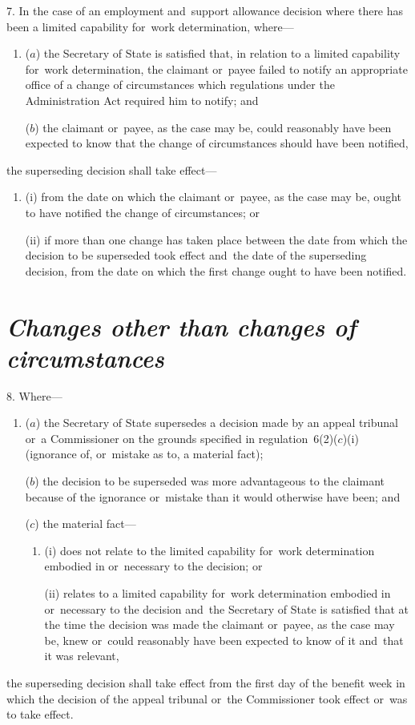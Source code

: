\documentclass[12pt,a4paper]{article}
\begin{document}
7.  In the case of an employment and~support allowance decision where there has been a limited capability for~work determination, where—
\begin{enumerate}\item[]
($a$) the Secretary of State is satisfied that, in relation to a limited capability for~work determination, the claimant or~payee failed to notify an appropriate office of a change of circumstances which regulations under the Administration Act required him to notify; and

($b$) the claimant or~payee, as the case may be, could reasonably have been expected to know that the change of circumstances should have been notified,
\end{enumerate}
the superseding decision shall take effect—
\begin{enumerate}\item[]
(i) from the date on which the claimant or~payee, as the case may be, ought to have notified the change of circumstances; or

(ii) if more than one change has taken place between the date from which the decision to be superseded took effect and~the date of the superseding decision, from the date on which the first change ought to have been notified.
\end{enumerate}

\section*{\itshape Changes other than changes of circumstances}

8.  Where—
\begin{enumerate}\item[]
($a$) the Secretary of State supersedes a decision made by an appeal tribunal or~a Commissioner on the grounds specified in regulation~6(2)($c$)(i)  (ignorance of, or~mistake as to, a material fact);

($b$) the decision to be superseded was more advantageous to the claimant because of the ignorance or~mistake than it would otherwise have been; and

($c$) the material fact—
\begin{enumerate}\item[]
(i) does not relate to the limited capability for~work determination embodied in or~necessary to the decision; or

(ii) relates to a limited capability for~work determination embodied in or~necessary to the decision and~the Secretary of State is satisfied that at the time the decision was made the claimant or~payee, as the case may be, knew or~could reasonably have been expected to know of it and~that it was relevant,
\end{enumerate}
\end{enumerate}
the superseding decision shall take effect from the first day of the benefit week in which the decision of the appeal tribunal or~the Commissioner took effect or~was to take effect.
\end{document}
